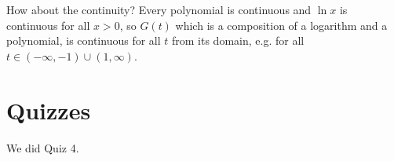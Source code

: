 \documentclass[10pt]{article}
\begin{document}
How about the continuity? Every polynomial is continuous and $\ln x$ is
continuous for all $x>0$, so $G(t)$ which is a composition of a logarithm and a
polynomial, is continuous for all $t$ from its domain, e.g. for all
$t\in (-\infty, -1) \cup (1, \infty)$.

\section{Quizzes}

We did Quiz 4.
\end{document}
